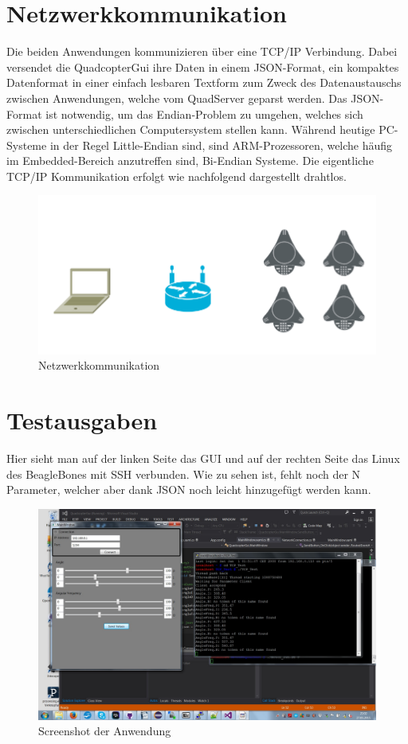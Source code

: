 \documentclass[]{scrartcl}
\begin{document}
\section{Netzwerkkommunikation}
Die beiden Anwendungen kommunizieren über eine TCP/IP Verbindung. Dabei versendet die QuadcopterGui ihre Daten in einem JSON-Format, ein kompaktes Datenformat in einer einfach lesbaren Textform zum Zweck des Datenaustauschs zwischen Anwendungen, welche vom QuadServer geparst werden. Das JSON-Format ist notwendig, um das Endian-Problem zu umgehen, welches sich zwischen unterschiedlichen Computersystem stellen kann. Während heutige PC-Systeme in der Regel Little-Endian sind, sind ARM-Prozessoren, welche häufig im Embedded-Bereich anzutreffen sind, Bi-Endian Systeme. Die eigentliche TCP/IP Kommunikation erfolgt wie nachfolgend dargestellt drahtlos.
\begin{figure}[h]
\centering
\includegraphics[scale=0.5]{img/comm.png} 
\caption{Netzwerkkommunikation}
\end{figure}

\newpage
\section{Testausgaben}
Hier sieht man auf der linken Seite das GUI und auf der rechten Seite das Linux des BeagleBones mit SSH verbunden. Wie zu sehen ist, fehlt noch der N Parameter, welcher aber dank JSON noch leicht hinzugefügt werden kann.
\begin{figure}[ht]
\includegraphics[scale=0.4]{img/screen.jpg} 
\caption{Screenshot der Anwendung}
\end{figure}
\end{document}
